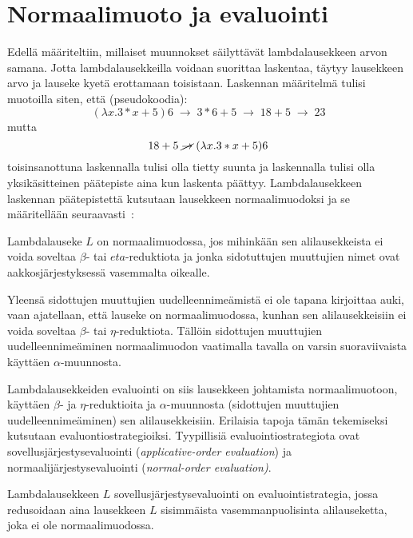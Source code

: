 \section{Normaalimuoto ja evaluointi}

Edellä määriteltiin, millaiset muunnokset säilyttävät lambdalausekkeen arvon samana. Jotta lambdalausekkeilla voidaan suorittaa laskentaa, täytyy lausekkeen arvo ja lauseke kyetä erottamaan toisistaan. Laskennan määritelmä tulisi muotoilla siten, että (pseudokoodia):
\[ 
(\lambda x. 3 * x + 5) 6 \; \rightarrow \; 3 * 6 + 5 \; \rightarrow \; 18 + 5 \; \rightarrow \; 23 
\]
mutta 
\[ 18 + 5 \; \cancel{\rightarrow} \; (\lambda x. 3 * x + 5) 6 \]
toisinsanottuna laskennalla tulisi olla tietty suunta ja laskennalla tulisi olla yksikäsitteinen päätepiste aina kun laskenta päättyy. Lambdalausekkeen laskennan päätepistettä kutsutaan lausekkeen normaalimuodoksi ja se määritellään seuraavasti~\cite[s.~9]{Hudak89}: 

\begin{maar}[normaalimuoto]
Lambdalauseke $L$ on normaalimuodossa, jos mihinkään sen alilausekkeista ei voida soveltaa $\beta$- tai $eta$-reduktiota ja jonka sidotuttujen muuttujien nimet ovat aakkosjärjestyksessä vasemmalta oikealle.  
\end{maar}

Yleensä sidottujen muuttujien uudelleennimeämistä ei ole tapana kirjoittaa auki, vaan ajatellaan, että lauseke on normaalimuodossa, kunhan sen alilausekkeisiin ei voida soveltaa $\beta$- tai $\eta$-reduktiota. Tällöin sidottujen muuttujien uudelleennimeäminen normaalimuodon vaatimalla tavalla on varsin suoraviivaista käyttäen $\alpha$-muunnosta.
\par
Lambdalausekkeiden evaluointi on siis lausekkeen johtamista normaalimuotoon, käyttäen $\beta$- ja $\eta$-reduktioita ja $\alpha$-muunnosta (sidottujen muuttujien uudelleennimeäminen) sen alilausekkeisiin. Erilaisia tapoja tämän tekemiseksi kutsutaan evaluontiostrategioiksi. Tyypillisiä evaluointiostrategiota ovat sovellusjärjestysevaluointi (\textit{applicative-order evaluation}) ja normaalijärjestysevaluointi (\textit{normal-order evaluation)}.

\begin{alg}[sovellusjärjestysevaluointi] 
Lambdalausekkeen $L$ sovellusjärjestysevaluointi on evaluointistrategia, jossa redusoidaan aina lausekkeen $L$ sisimmäista vasemmanpuolisinta alilauseketta, joka ei ole normaalimuodossa.
\end{alg}

